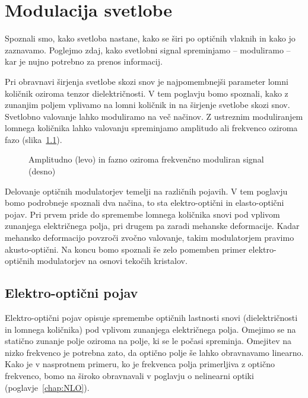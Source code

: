 
\chapter{Modulacija svetlobe}
\label{chap:modulacija}
Spoznali smo, kako svetloba nastane, kako se širi po optičnih vlaknih in kako
jo zaznavamo. Poglejmo zdaj, kako svetlobni signal spreminjamo -- moduliramo -- kar
je nujno potrebno za prenos informacij. 

Pri obravnavi širjenja svetlobe skozi snov je najpomembnejši parameter lomni količnik
oziroma tenzor dielektričnosti. V tem poglavju bomo spoznali, kako z zunanjim poljem vplivamo 
na lomni količnik in na širjenje svetlobe skozi snov. Svetlobno 
valovanje lahko moduliramo na več načinov. Z ustreznim moduliranjem
lomnega količnika lahko valovanju spreminjamo amplitudo 
ali frekvenco oziroma fazo
 (slika~\ref{fig:amfm}). 
\begin{figure}[h]
\centering
\def\svgwidth{140truemm} 

\caption{Amplitudno (levo) in fazno oziroma frekvenčno moduliran signal (desno)
}
\label{fig:amfm}
\end{figure}

Delovanje optičnih modulatorjev temelji na različnih pojavih. V tem poglavju bomo 
podrobneje spoznali dva načina, to sta elektro-optični in elasto-optični pojav. 
Pri prvem pride do spremembe lomnega količnika snovi pod vplivom zunanjega električnega polja, 
pri drugem pa zaradi mehanske deformacije. Kadar mehansko deformacijo povzroči zvočno valovanje, 
takim modulatorjem pravimo akusto-optični. Na koncu bomo spoznali še zelo pomemben 
primer elektro-optičnih modulatorjev na osnovi tekočih kristalov.

\section{Elektro-optični pojav}
Elektro-optični pojav opisuje spremembe optičnih lastnosti 
snovi (dielektričnosti in lomnega količnika) pod vplivom 
zunanjega električnega polja. Omejimo se na statično zunanje polje oziroma
na polje, ki se le počasi spreminja. Omejitev na nizko 
frekvenco je potrebna zato, da optično polje še lahko obravnavamo linearno. 
Kako je v nasprotnem primeru, ko je frekvenca polja primerljiva z optično frekvenco, 
bomo na široko obravnavali v poglavju o nelinearni optiki (poglavje~\ref{chap:NLO}).

